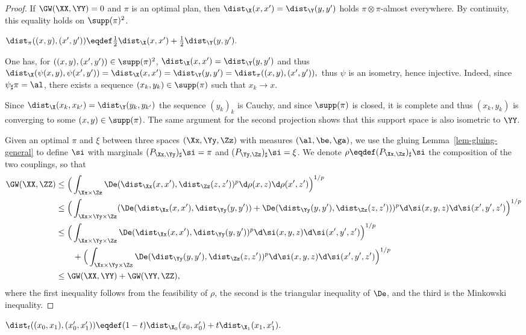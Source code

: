 \begin{proof}
If $\GW( \XX,\YY )=0$ and $\pi$ is an optimal plan, then $\dist_\X(x,x')=\dist_\Y(y,y')$ holds $\pi \otimes \pi$-almost everywhere. By continuity, this equality holds on $\supp(\pi)^2$.

\(\dist_\pi((x,y),(x',y')) \eqdef \frac{1}{2} \dist_\X(x,x') + \frac{1}{2} \dist_\Y(y,y').\)

One has, for $((x,y),(x',y')) \in \supp(\pi)^2$, $\dist_\X(x,x')=\dist_\Y(y,y')$ and thus
\(\dist_\X(\psi(x,y),\psi(x',y')) = \dist_\X(x,x') = \dist_\Y(y,y') = \dist_\pi((x,y),(x',y')),\)
thus $\psi$ is an isometry, hence injective. Indeed, since $\psi_\sharp \pi = \al$, there exists a sequence $(x_k,y_k) \in \supp(\pi)$ such that $x_k \rightarrow x$.

Since $\dist_\X(x_k,x_{k'})=\dist_\Y(y_k,y_{k'})$ the sequence $(y_k)_k$ is Cauchy, and since $\supp(\pi)$ is closed, it is complete and thus $(x_k,y_k)$ is converging to some $(x,y) \in \supp(\pi)$. The same argument for the second projection shows that this support space is also isometric to $\YY$.

Given an optimal $\pi$ and $\xi$ between three spaces $(\Xx,\Yy,\Zz)$ with measures $(\al,\be,\ga)$, we use the gluing Lemma~\ref{lem-gluing-general} to define $\si$ with marginals $(P_{\Xx,\Yy})_\sharp \si = \pi$ and $(P_{\Yy,\Zz})_\sharp \si = \xi$.
We denote $\rho \eqdef (P_{\Xx,\Zz})_\sharp \si$ the composition of the two couplings, so that
$$\begin{aligned}
\GW( \XX,\ZZ ) & \leq \Big( \int_{\Xx \times \Zz} \De(\dist_\Xx(x,x'),\dist_\Zz(z,z'))^p \d\rho(x,z)\d\rho(x',z') \Big)^{1/p}
\\
&\leq \Big( \int_{\Xx \times \Yy \times \Zz} ( \De(\dist_\Xx(x,x'),\dist_\Yy(y,y')) + \De(\dist_\Yy(y,y'),\dist_\Zz(z,z')) )^p \d\si(x,y,z) \d\si(x',y',z')\Big)^{1/p} \\
&\leq \Big( \int_{\Xx \times \Yy \times \Zz} \De(\dist_\Xx(x,x'),\dist_\Yy(y,y'))^p \d\si(x,y,z) \d\si(x',y',z')\Big)^{1/p} \\
&\qquad +
\Big( \int_{\Xx \times \Yy \times \Zz} \De(\dist_\Yy(y,y'),\dist_\Zz(z,z'))^p \d\si(x,y,z) \d\si(x',y',z')\Big)^{1/p}
\\
&\leq \GW( \XX,\YY ) + \GW( \YY,\ZZ ),
\end{aligned}$$
where the first inequality follows from the feasibility of $\rho$, the second is the triangular inequality of $\De$,
and the third is the Minkowski inequality.
\end{proof}
\begin{rem}
\(\dist_t((x_0,x_1), (x_0',x_1')) \eqdef (1-t)\dist_{\X_0}(x_0,x_0') + t\dist_{\X_1}(x_1,x_1').\)
\end{rem}
